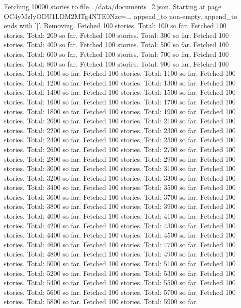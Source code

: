 \begin{pyprint}
Fetching 10000 stories to file ../data/documents_2.json. Starting at page OC4yMzIyODU1LDM2MTg4NTE0Nzc=...
append_to non-empty.
append_to ends with ']'. Removing.
Fetched 100 stories. Total: 100 so far.
Fetched 100 stories. Total: 200 so far.
Fetched 100 stories. Total: 300 so far.
Fetched 100 stories. Total: 400 so far.
Fetched 100 stories. Total: 500 so far.
Fetched 100 stories. Total: 600 so far.
Fetched 100 stories. Total: 700 so far.
Fetched 100 stories. Total: 800 so far.
Fetched 100 stories. Total: 900 so far.
Fetched 100 stories. Total: 1000 so far.
Fetched 100 stories. Total: 1100 so far.
Fetched 100 stories. Total: 1200 so far.
Fetched 100 stories. Total: 1300 so far.
Fetched 100 stories. Total: 1400 so far.
Fetched 100 stories. Total: 1500 so far.
Fetched 100 stories. Total: 1600 so far.
Fetched 100 stories. Total: 1700 so far.
Fetched 100 stories. Total: 1800 so far.
Fetched 100 stories. Total: 1900 so far.
Fetched 100 stories. Total: 2000 so far.
Fetched 100 stories. Total: 2100 so far.
Fetched 100 stories. Total: 2200 so far.
Fetched 100 stories. Total: 2300 so far.
Fetched 100 stories. Total: 2400 so far.
Fetched 100 stories. Total: 2500 so far.
Fetched 100 stories. Total: 2600 so far.
Fetched 100 stories. Total: 2700 so far.
Fetched 100 stories. Total: 2800 so far.
Fetched 100 stories. Total: 2900 so far.
Fetched 100 stories. Total: 3000 so far.
Fetched 100 stories. Total: 3100 so far.
Fetched 100 stories. Total: 3200 so far.
Fetched 100 stories. Total: 3300 so far.
Fetched 100 stories. Total: 3400 so far.
Fetched 100 stories. Total: 3500 so far.
Fetched 100 stories. Total: 3600 so far.
Fetched 100 stories. Total: 3700 so far.
Fetched 100 stories. Total: 3800 so far.
Fetched 100 stories. Total: 3900 so far.
Fetched 100 stories. Total: 4000 so far.
Fetched 100 stories. Total: 4100 so far.
Fetched 100 stories. Total: 4200 so far.
Fetched 100 stories. Total: 4300 so far.
Fetched 100 stories. Total: 4400 so far.
Fetched 100 stories. Total: 4500 so far.
Fetched 100 stories. Total: 4600 so far.
Fetched 100 stories. Total: 4700 so far.
Fetched 100 stories. Total: 4800 so far.
Fetched 100 stories. Total: 4900 so far.
Fetched 100 stories. Total: 5000 so far.
Fetched 100 stories. Total: 5100 so far.
Fetched 100 stories. Total: 5200 so far.
Fetched 100 stories. Total: 5300 so far.
Fetched 100 stories. Total: 5400 so far.
Fetched 100 stories. Total: 5500 so far.
Fetched 100 stories. Total: 5600 so far.
Fetched 100 stories. Total: 5700 so far.
Fetched 100 stories. Total: 5800 so far.
Fetched 100 stories. Total: 5900 so far.

\end{pyprint}
